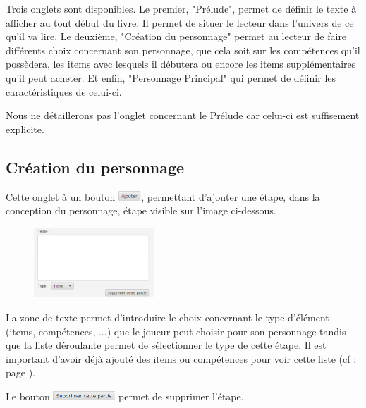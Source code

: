 		Trois onglets sont disponibles. Le premier, "Prélude", permet de définir le texte à afficher au tout début du livre. Il permet de situer le lecteur dans l'univers de ce qu'il va lire. Le deuxième, "Création du personnage" permet au lecteur de faire différents choix concernant son personnage, que cela soit sur les compétences qu'il possèdera, les items avec lesquels il débutera ou encore les items supplémentaires qu'il peut acheter. Et enfin, "Personnage Principal" qui permet de définir les caractéristiques de celui-ci.

		Nous ne détaillerons pas l'onglet concernant le Prélude car celui-ci est suffisement explicite.

		\subsection{Création du personnage}
			Cette onglet à un bouton \includegraphics[height=10pt, keepaspectratio]{img/ajouterBouton.png}, permettant d'ajouter une étape, dans la conception du personnage, étape visible sur l'image ci-dessous.

			\begin{figure}[H]
				\centering\includegraphics[width=0.4\textwidth, keepaspectratio]{img/etapeConceptionPerso.png}
			\end{figure}

			La zone de texte permet d'introduire le choix concernant le type d'élément (items, compétences, ...) que le joueur peut choisir pour son personnage tandis que la liste déroulante permet de sélectionner le type de cette étape. Il est important d'avoir déjà ajouté des items ou compétences pour voir cette liste (cf :  page \pageref{chapter:elementsConstitutifLivre}).

			Le bouton \includegraphics[height=10pt, keepaspectratio]{img/preludeSupprimerBouton.png} permet de supprimer l'étape.

